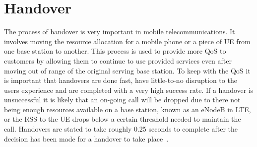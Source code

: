 \section{Handover}\label{handover}
The process of handover is very important in mobile telecommunications. It involves moving the resource allocation for a mobile phone or a piece of \ac{UE} from one base station to another. This process is used to provide more \ac{QoS} to customers by allowing them to continue to use provided services even after moving out of range of the original serving base station. To keep with the QoS it is important that handovers are done fast, have little-to-no disruption to the users experience and are completed with a very high success rate. If a handover is unsuccessful it is likely that an on-going call will be dropped due to there not being enough resources available on a base station, known as an \ac{eNodeB} in \ac{LTE}, or the \ac{RSS} to the \ac{UE} drops below a certain threshold needed to maintain the call. Handovers are stated to take roughly 0.25 seconds to complete after the decision has been made for a handover to take place~\cite{jansen2010handover}.
